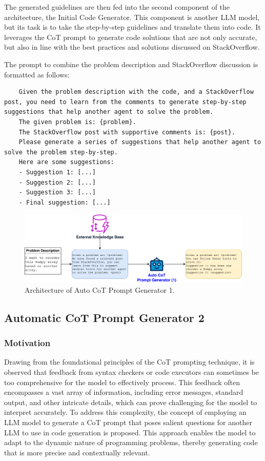 \documentclass[a4paper,oneside]{book}
\begin{document}
The generated guidelines are then fed into the second component of the architecture, the Initial Code Generator. This component is another LLM model, but its task is to take the step-by-step guidelines and translate them into code. It leverages the CoT prompt to generate code solutions that are not only accurate, but also in line with the best practices and solutions discussed on StackOverflow.

The prompt to combine the problem description and StackOverflow discussion is formatted as follows:

\begin{lstlisting}
    Given the problem description with the code, and a StackOverflow post, you need to learn from the comments to generate step-by-step suggestions that help another agent to solve the problem.
    The given problem is: {problem}.
    The StackOverflow post with supportive comments is: {post}.
    Please generate a series of suggestions that help another agent to solve the problem step-by-step.
    Here are some suggestions:
    - Suggestion 1: [...]
    - Suggestion 2: [...]
    - Suggestion 3: [...]
    - Final suggestion: [...]
\end{lstlisting}

\begin{figure}[H]
    \centering
    \includegraphics[width=1.0\textwidth]{img/cot_generator_1}
    \caption{Architecture of Auto CoT Prompt Generator 1.}\label{fig:cot_generator_1}
\end{figure}

\subsection{Automatic CoT Prompt Generator 2}
\subsubsection{Motivation}
Drawing from the foundational principles of the CoT prompting technique, it is observed that feedback from syntax checkers or code executors can sometimes be too comprehensive for the model to effectively process. This feedback often encompasses a vast array of information, including error messages, standard output, and other intricate details, which can prove challenging for the model to interpret accurately. To address this complexity, the concept of employing an LLM model to generate a CoT prompt that poses salient questions for another LLM to use in code generation is proposed. This approach enables the model to adapt to the dynamic nature of programming problems, thereby generating code that is more precise and contextually relevant.
\end{document}
